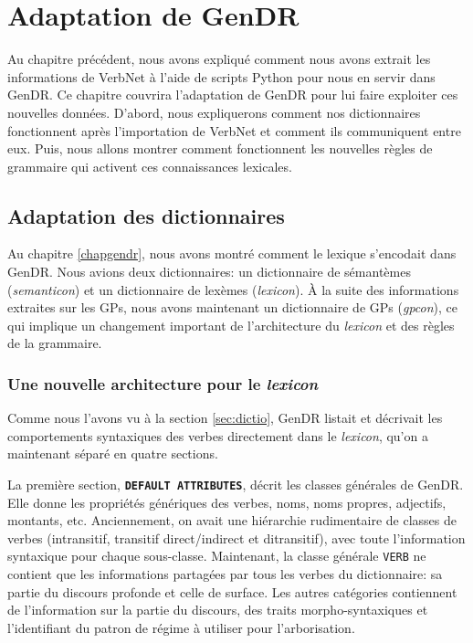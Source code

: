 
\chapter{Adaptation de GenDR}\label{ch:implementation}

Au chapitre précédent, nous avons expliqué comment nous avons extrait les informations de VerbNet à l'aide de scripts Python pour nous en servir dans GenDR. Ce chapitre couvrira l'adaptation de GenDR pour lui faire exploiter ces nouvelles données. D'abord, nous expliquerons comment nos dictionnaires fonctionnent après l'importation de VerbNet et comment ils communiquent entre eux. Puis, nous allons montrer comment fonctionnent les nouvelles règles de grammaire qui activent ces connaissances lexicales.

\section{Adaptation des dictionnaires}

Au chapitre \ref{chapgendr}, nous avons montré comment le lexique s'encodait dans GenDR. Nous avions deux dictionnaires: un dictionnaire de sémantèmes (\emph{semanticon}) et un dictionnaire de lexèmes (\emph{lexicon}). À la suite des informations extraites sur les \acp{GP}, nous avons maintenant un dictionnaire de \acp{GP} (\emph{gpcon}), ce qui implique un changement important de l'architecture du \emph{lexicon} et des règles de la grammaire.

\subsection{Une nouvelle architecture pour le \emph{lexicon}}

Comme nous l'avons vu à la section \ref{sec:dictio}, GenDR listait et décrivait les comportements syntaxiques des verbes directement dans le \emph{lexicon}, qu'on a maintenant séparé en quatre sections.

La première section, \textbf{\texttt{DEFAULT ATTRIBUTES}}, décrit les classes générales de GenDR. Elle donne les propriétés génériques des verbes, noms, noms propres, adjectifs, montants, etc. Anciennement, on avait une hiérarchie rudimentaire de classes de verbes (intransitif, transitif direct/indirect et ditransitif), avec toute l'information syntaxique pour chaque sous-classe. Maintenant, la classe générale \texttt{VERB} ne contient que les informations partagées par tous les verbes du dictionnaire: sa partie du discours profonde et celle de surface. Les autres catégories contiennent de l'information sur la partie du discours, des traits morpho-syntaxiques et l'identifiant du patron de régime à utiliser pour l'arborisation. 

